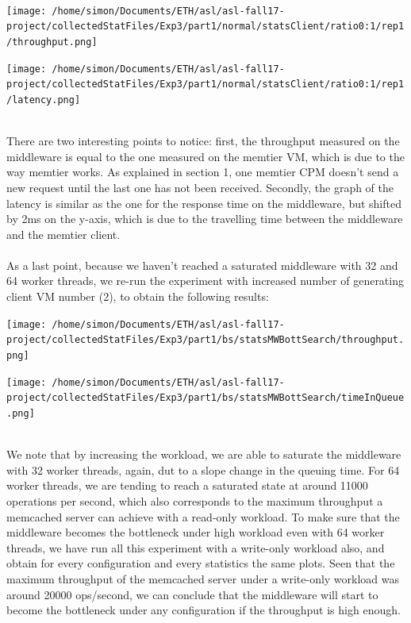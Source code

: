 \documentclass[11pt,a4paper]{article}
\begin{document}
\\
\begin{minipage}{0.5\linewidth}
\texttt{[image: /home/simon/Documents/ETH/asl/asl-fall17-project/collectedStatFiles/Exp3/part1/normal/statsClient/ratio0:1/rep1/throughput.png]}
\end{minipage}
\hfill
\begin{minipage}{0.5\linewidth}
\texttt{[image: /home/simon/Documents/ETH/asl/asl-fall17-project/collectedStatFiles/Exp3/part1/normal/statsClient/ratio0:1/rep1/latency.png]}
\end{minipage}
\\
There are two interesting points to notice: first, the throughput measured on the middleware is equal to the one measured on the memtier VM, which is due to the way memtier works. As explained in section 1, one memtier CPM doesn't send a new request until the last one has not been received. Secondly, the graph of the latency is similar as the one for the response time on the middleware, but shifted by 2ms on the y-axis, which is due to the travelling time between the middleware and the memtier client. 
\\
\\
As a last point, because we haven't reached a saturated middleware with 32 and 64 worker threads, we re-run the experiment with increased number of generating client VM number (2), to obtain the following results:
\\
\begin{minipage}{0.5\linewidth}
\texttt{[image: /home/simon/Documents/ETH/asl/asl-fall17-project/collectedStatFiles/Exp3/part1/bs/statsMWBottSearch/throughput.png]}
\end{minipage}
\hfill
\begin{minipage}{0.5\linewidth}
\texttt{[image: /home/simon/Documents/ETH/asl/asl-fall17-project/collectedStatFiles/Exp3/part1/bs/statsMWBottSearch/timeInQueue.png]}
\end{minipage}
\\
We note that by increasing the workload, we are able to saturate the middleware with 32 worker threads, again, dut to a slope change in the queuing time. For 64 worker threads, we are tending to reach a saturated state at around 11000 operations per second, which also corresponds to the maximum throughput a memcached server can achieve with a read-only workload. To make sure that the middleware becomes the bottleneck under high workload even with 64 worker threads, we have run all this experiment with a write-only workload also, and obtain for every configuration and every statistics the same plots. Seen that the maximum throughput of the memcached server under a write-only workload was around 20000 ops/second, we can conclude that the middleware will start to become the bottleneck under any configuration if the throughput is high enough. 
   
\end{document}
